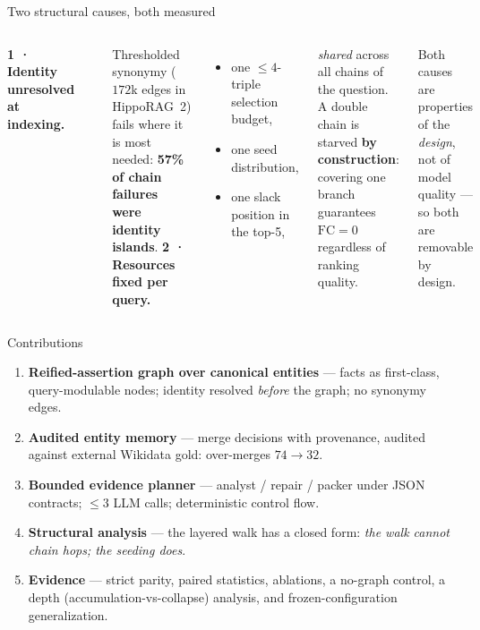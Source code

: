 \documentclass[aspectratio=169,10pt]{beamer}
\newcommand{\hippo}{HippoRAG~2}
\newcommand{\bad}[1]{\textcolor{teja}{\textbf{#1}}}
\begin{document}
\begin{frame}{Two structural causes, both measured}
\begin{columns}[T]
\textbf{1 · Identity unresolved at indexing.}
\begin{center}
\end{center}
\scriptsize Thresholded synonymy ($172$k edges in \hippo{}) fails where it
is most needed: \bad{57\% of chain failures were identity islands}.
\textbf{2 · Resources fixed per query.}
\begin{itemize}\footnotesize
\item one $\le 4$-triple selection budget,
\item one seed distribution,
\item one slack position in the top-5,
\end{itemize}
\emph{shared} across all chains of the question. A double chain is starved
\textbf{by construction}: covering one branch guarantees $\mathrm{FC}=0$
regardless of ranking quality.
\vspace{2mm}

\scriptsize Both causes are properties of the \emph{design}, not of model
quality --- so both are removable by design.
\end{columns}
\end{frame}

\begin{frame}{Contributions}
\begin{enumerate}
\item \textbf{Reified-assertion graph over canonical entities} --- facts as
  first-class, query-modulable nodes; identity resolved \emph{before} the
  graph; no synonymy edges.
\item \textbf{Audited entity memory} --- merge decisions with provenance,
  audited against external Wikidata gold: over-merges $74\to32$.
\item \textbf{Bounded evidence planner} --- analyst / repair / packer under
  JSON contracts; $\le 3$ LLM calls; deterministic control flow.
\item \textbf{Structural analysis} --- the layered walk has a closed form:
  \emph{the walk cannot chain hops; the seeding does}.
\item \textbf{Evidence} --- strict parity, paired statistics, ablations,
  a no-graph control, a depth (accumulation-vs-collapse) analysis, and
  frozen-configuration generalization.
\end{enumerate}
\end{frame}
\end{document}
